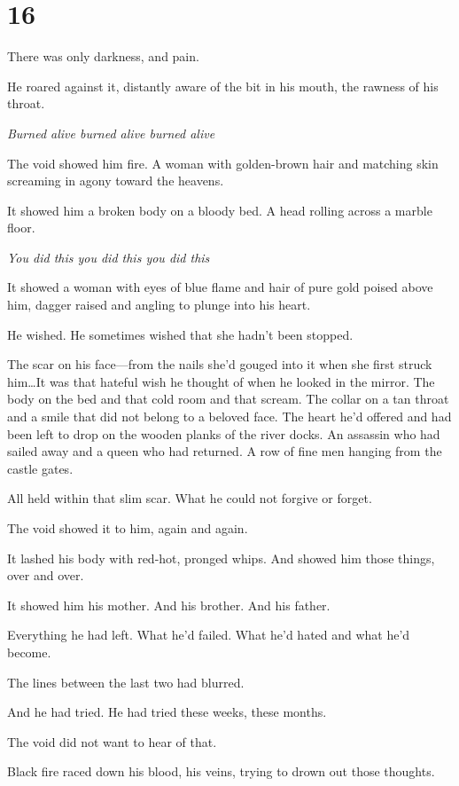 
\chapter{16}

There was only darkness, and pain.

He roared against it, distantly aware of the bit in his mouth, the rawness of his throat.

\emph{Burned alive burned alive burned alive}

The void showed him fire.
A woman with golden-brown hair and matching skin screaming in agony toward the heavens.

It showed him a broken body on a bloody bed.
A head rolling across a marble floor.

\emph{You did this you did this you did this}

It showed a woman with eyes of blue flame and hair of pure gold poised above him, dagger raised and angling to plunge into his heart.

He wished.
He sometimes wished that she hadn't been stopped.

The scar on his face---from the nails she'd gouged into it when she first struck him\ldots It was that hateful wish he thought of when he looked in the mirror.
The body on the bed and that cold room and that scream.
The collar on a tan throat and a smile that did not belong to a beloved face.
The heart he'd offered and had been left to drop on the wooden planks of the river docks.
An assassin who had sailed away and a queen who had returned.
A row of fine men hanging from the castle gates.

All held within that slim scar.
What he could not forgive or forget.

The void showed it to him, again and again.

It lashed his body with red-hot, pronged whips.
And showed him those things, over and over.

It showed him his mother.
And his brother.
And his father.

Everything he had left.
What he'd failed.
What he'd hated and what he'd become.

The lines between the last two had blurred.

And he had tried.
He had tried these weeks, these months.

The void did not want to hear of that.

Black fire raced down his blood, his veins, trying to drown out those thoughts.

